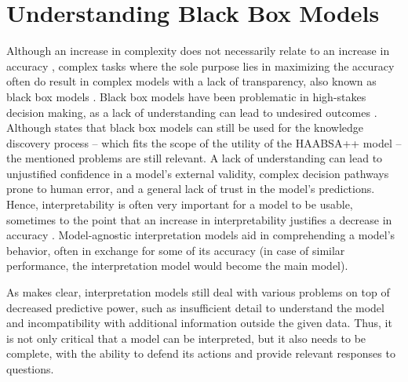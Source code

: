 \section{Understanding Black Box Models}
    \label{sec:lit_black_box}
Although an increase in complexity does not necessarily relate to an increase in accuracy \cite{Rudin}, complex tasks where the sole purpose lies in maximizing the accuracy often do result in complex models with a lack of transparency, also known as black box models \cite{London}. Black box models have been problematic in high-stakes decision making, as a lack of understanding can lead to undesired outcomes \cite{Rudin}. Although \cite{Rudin} states that black box models can still be used for the knowledge discovery process -- which fits the scope of the utility of the HAABSA++ model -- the mentioned problems are still relevant. A lack of understanding can lead to unjustified confidence in a model's external validity, complex decision pathways prone to human error, and a general lack of trust in the model's predictions. Hence, interpretability is often very important for a model to be usable, sometimes to the point that an increase in interpretability justifies a decrease in accuracy \cite{Ribeiro}. Model-agnostic interpretation models aid in comprehending a model's behavior, often in exchange for some of its accuracy (in case of similar performance, the interpretation model would become the main model).

As \cite{Rudin} makes clear, interpretation models still deal with various problems on top of decreased predictive power, such as insufficient detail to understand the model and incompatibility with additional information outside the given data. Thus, it is not only critical that a model can be interpreted, but it also needs to be complete, with the ability to defend its actions and provide relevant responses to questions. 

